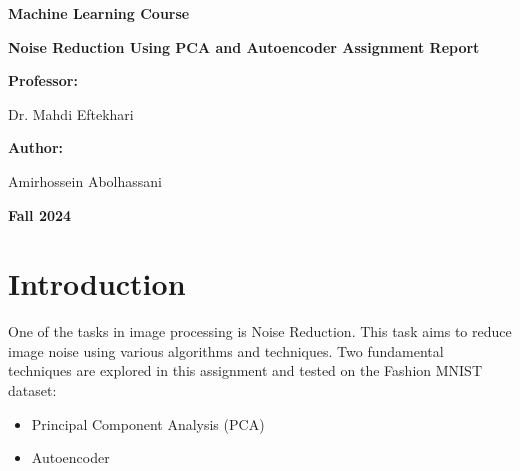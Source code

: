 \documentclass[12pt]{article}
\def\maketitle{
	\begin{titlepage}
		\begin{center}
			\vspace*{2cm}
			
			{\Large\bfseries Machine Learning Course\par}
			\vspace{2cm}
			
			{\Huge\bfseries Noise Reduction Using PCA and Autoencoder Assignment Report\par}
			\vspace{3cm}
			
			{\large\bfseries Professor:\par}
			{\large Dr. Mahdi Eftekhari\par}
			\vspace{1.5cm}
			
			{\large\bfseries Author:\par}
			{\large Amirhossein Abolhassani\par}
			\vspace{2cm}
			
			\vfill  %
			
			{\large\bfseries Fall 2024}
			
		\end{center}
	\end{titlepage}
	\setcounter{page}{1}
}
\begin{document}
	\maketitle
	\tableofcontents
	\newpage
	\section{Introduction}
	One of the tasks in image processing is Noise Reduction. This task aims to reduce image noise using various algorithms and techniques. Two fundamental techniques are explored in this assignment and tested on the Fashion MNIST dataset:
	\begin{itemize}
		\item Principal Component Analysis (PCA)
		\item Autoencoder
	\end{itemize}
\end{document}
